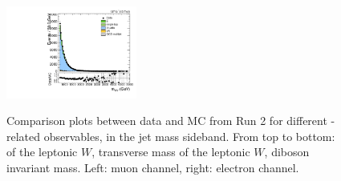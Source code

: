 \begin{figure}[htbp]
  \includegraphics[width=0.3825\textwidth]{fig/controlPlots/SB_b1_e_allP_allC_allD_Run2_mWV.pdf}\\
  \caption{
    Comparison plots between data and MC from Run 2 for different \Wlep-related observables, in the jet mass sideband.
    From top to bottom: \pt of the leptonic $W$, transverse mass of the leptonic $W$, diboson invariant mass.
    Left: muon channel, right: electron channel.
  }
  \label{fig:SB_controlPlotsRun2_2}
\end{figure}

